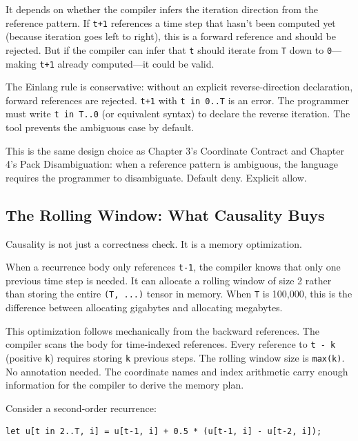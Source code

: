 \documentclass[11pt,titlepage]{article}
\begin{document}
It depends on whether the compiler infers the iteration direction from
the reference pattern. If \texttt{t+1} references a time step that
hasn't been computed yet (because iteration goes left to right), this is
a forward reference and should be rejected. But if the compiler can
infer that \texttt{t} should iterate from \texttt{T} down to
\texttt{0}---making \texttt{t+1} already computed---it could be valid.

The Einlang rule is conservative: without an explicit reverse-direction
declaration, forward references are rejected. \texttt{t+1} with
\texttt{t\ in\ 0..T} is an error. The programmer must write
\texttt{t\ in\ T..0} (or equivalent syntax) to declare the reverse
iteration. The tool prevents the ambiguous case by default.

This is the same design choice as Chapter 3's Coordinate Contract and
Chapter 4's Pack Disambiguation: when a reference pattern is ambiguous,
the language requires the programmer to disambiguate. Default deny.
Explicit allow.

\vspace{2em}

\hypertarget{the-rolling-window-what-causality-buys}{%
\subsection{The Rolling Window: What Causality
Buys}\label{the-rolling-window-what-causality-buys}}

Causality is not just a correctness check. It is a memory optimization.

When a recurrence body only references \texttt{t-1}, the compiler knows
that only one previous time step is needed. It can allocate a rolling
window of size 2 rather than storing the entire \texttt{(T,\ ...)}
tensor in memory. When \texttt{T} is 100,000, this is the difference
between allocating gigabytes and allocating megabytes.

This optimization follows mechanically from the backward references. The
compiler scans the body for time-indexed references. Every reference to
\texttt{t\ -\ k} (positive \texttt{k}) requires storing \texttt{k}
previous steps. The rolling window size is \texttt{max(k)}. No
annotation needed. The coordinate names and index arithmetic carry
enough information for the compiler to derive the memory plan.

Consider a second-order recurrence:

\begin{verbatim}
let u[t in 2..T, i] = u[t-1, i] + 0.5 * (u[t-1, i] - u[t-2, i]);
\end{verbatim}
\end{document}
